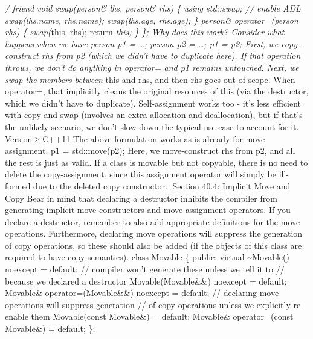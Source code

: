 \emph{/ friend void swap(person\& lhs, person\& rhs) \{ using std::swap;
// enable ADL swap(lhs.name, rhs.name); swap(lhs.age, rhs.age); \}
person\& operator=(person rhs) \{ swap(}this, rhs); return \emph{this;
\} \}; Why does this work? Consider what happens when we have person p1
= \ldots; person p2 = \ldots; p1 = p2; First, we copy-construct rhs from
p2 (which we didn't have to duplicate here). If that operation throws,
we don't do anything in operator= and p1 remains untouched. Next, we
swap the members between }this and rhs, and then rhs goes out of scope.
When operator=, that implicitly cleans the original resources of this
(via the destructor, which we didn't have to duplicate). Self-assignment
works too - it's less eﬃcient with copy-and-swap (involves an extra
allocation and deallocation), but if that's the unlikely scenario, we
don't slow down the typical use case to account for it. Version ≥ C++11
The above formulation works as-is already for move assignment. p1 =
std::move(p2); Here, we move-construct rhs from p2, and all the rest is
just as valid. If a class is movable but not copyable, there is no need
to delete the copy-assignment, since this assignment operator will
simply be ill-formed due to the deleted copy constructor. Section 40.4:
Implicit Move and Copy Bear in mind that declaring a destructor inhibits
the compiler from generating implicit move constructors and move
assignment operators. If you declare a destructor, remember to also add
appropriate deﬁnitions for the move operations. Furthermore, declaring
move operations will suppress the generation of copy operations, so
these should also be added (if the objects of this class are required to
have copy semantics). class Movable \{ public: virtual
\textasciitilde Movable() noexcept = default; // compiler won't generate
these unless we tell it to // because we declared a destructor
Movable(Movable\&\&) noexcept = default; Movable\&
operator=(Movable\&\&) noexcept = default; // declaring move operations
will suppress generation // of copy operations unless we explicitly
re-enable them Movable(const Movable\&) = default; Movable\&
operator=(const Movable\&) = default; \};
